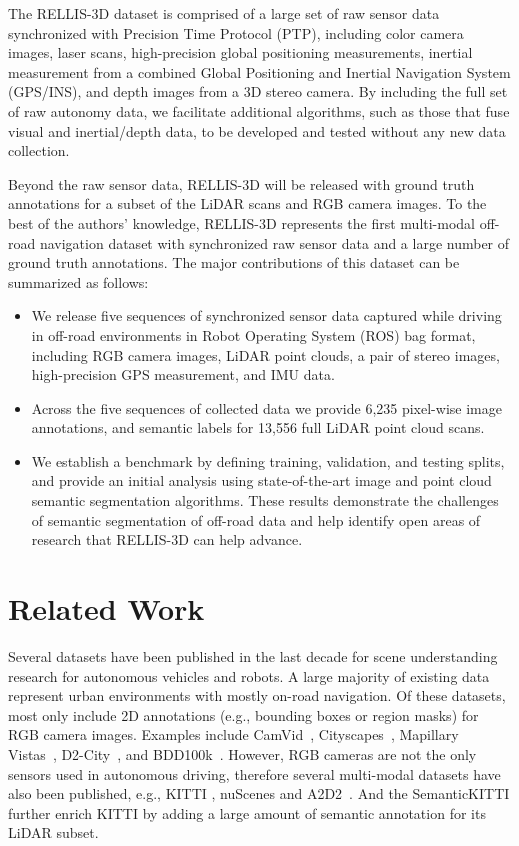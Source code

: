 \documentclass[letterpaper, 10 pt, conference]{ieeeconf}
\begin{document}
 The RELLIS-3D dataset is comprised of a large set of raw sensor data synchronized with Precision Time Protocol (PTP), including color camera images, laser scans, high-precision global positioning measurements, inertial measurement from a combined Global Positioning and Inertial Navigation System (GPS/INS), and depth images from a 3D stereo camera. By including the full set of raw autonomy data, we facilitate additional algorithms, such as those that fuse visual and inertial/depth data, to be developed and tested without any new data collection.

Beyond the raw sensor data, RELLIS-3D will be released with ground truth annotations for a subset of the LiDAR scans and RGB camera images. To the best of the authors' knowledge, RELLIS-3D represents the first multi-modal off-road navigation dataset with synchronized raw sensor data and a large number of ground truth annotations. The major contributions of this dataset can be summarized as follows:
\begin{itemize}
  \item We release five sequences of synchronized sensor data captured while driving in off-road environments in Robot Operating System (ROS) bag format, including RGB camera images, LiDAR point clouds, a pair of stereo images, high-precision GPS measurement, and IMU data.
  \item Across the five sequences of collected data we provide 6,235 pixel-wise image annotations, and semantic labels for 13,556 full LiDAR point cloud scans.
  \item We establish a benchmark by defining training, validation, and testing splits, and provide an initial analysis using state-of-the-art image and point cloud semantic segmentation algorithms. These results demonstrate the challenges of semantic segmentation of off-road data and help identify open areas of research that RELLIS-3D can help advance.
\end{itemize}



 \section{Related Work}
Several datasets have been published in the last decade for scene understanding research for autonomous vehicles and robots. A large majority of existing data represent urban environments with mostly on-road navigation. Of these datasets, most only include 2D annotations (e.g., bounding boxes or region masks) for RGB camera images. Examples include CamVid~\cite{Brostow2009}, Cityscapes~\cite{Cordts2016}, Mapillary Vistas~\cite{Neuhold2017}, D2-City~\cite{Che2019}, and BDD100k~\cite{Yu2018}. However, RGB cameras are not the only sensors used in autonomous driving, therefore several multi-modal datasets have also been published, e.g., KITTI \cite{Geiger2013IJRR}, nuScenes\cite{Caesar2019} and A2D2~\cite{Geyer2020}. And the SemanticKITTI \cite{behley2019iccv} further enrich KITTI by adding a large amount of semantic annotation for its LiDAR subset. 
\end{document}
